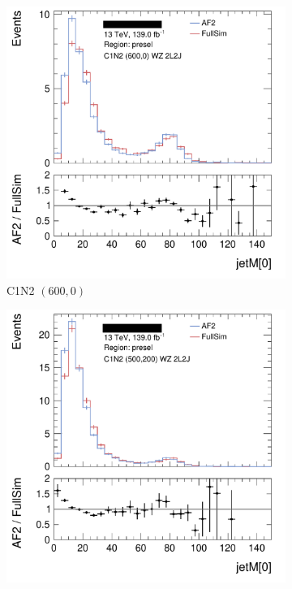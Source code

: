 \begin{figure}[tp]
\centering
\begin{subfigure}{0.495\textwidth}
\centering
\includegraphics[width=\textwidth]{figures/2ljets_C1N2_WZ_600_0_2L2J_presel_jetM[0]_26.png}
\caption{C1N2 $(600, 0)$}
\end{subfigure}
\hfill
\begin{subfigure}{0.495\textwidth}
\centering
\includegraphics[width=\textwidth]{figures/2ljets_C1N2_WZ_500p0_200p0_2L2J_presel_jetM[0]_38.png}

\end{subfigure}
\end{figure}

